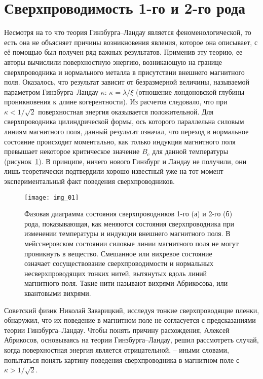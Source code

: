 \section{Сверхпроводимость 1-го и 2-го рода}

Несмотря на то что теория Гинзбурга–Ландау является феноменологической, то 
есть она не объясняет причины возникновения явления, которое она описывает, с 
её помощью был получен ряд важных результатов. Применив эту теорию, ее авторы 
вычислили поверхностную энергию, возникающую на границе сверхпроводника и 
нормального металла в присутствии внешнего магнитного поля. Оказалось, что 
результат зависит от безразмерной величины, называемой параметром 
Гинзбурга–Ландау \( \kappa \): \( \kappa = \lambda/\xi \) (отношение 
лондоновской глубины проникновения к длине когерентности). Из расчетов 
следовало, что при \( \kappa < 1/\sqrt{2} \) поверхностная энергия оказывается 
положительной. Для сверхпроводника цилиндрической формы, ось которого 
параллельна силовым линиям магнитного поля, данный результат означал, что 
переход в нормальное состояние происходит моментально, как только индукция 
магнитного поля превышает некоторое критическое значение \( B_c \) для данной 
температуры (рисунок~\ref{img:01}). В принципе, ничего нового Гинзбург и 
Ландау не получили, они лишь теоретически подтвердили хорошо известный уже на 
тот момент экспериментальный факт поведения сверхпроводников.

\begin{figure}[h!]
    \center
    \texttt{[image: img\_01]}
    \caption{Фазовая диаграмма состояния сверхпроводников 1-го (а) и 
        2-го (б) рода, показывающая, как меняются состояния сверхпроводника 
        при изменении температуры и индукции внешнего магнитного поля. В 
        мейсснеровском состоянии силовые линии магнитного поля не могут 
        проникнуть в вещество. Смешанное или вихревое состояние означает 
        сосуществование сверхпроводимости и нормальных несверхпроводящих 
        тонких нитей, вытянутых вдоль линий магнитного поля. Такие нити 
        называют вихрями Абрикосова, или квантовыми вихрями.}
    \label{img:01}
\end{figure}

Советский физик Николай Заварицкий, исследуя тонкие сверхпроводящие пленки, 
обнаружил, что их поведение в магнитном поле не согласуется с предсказаниями 
теории Гинзбурга–Ландау. Чтобы понять причину расхождения, Алексей Абрикосов, 
основываясь на теории Гинзбурга–Ландау, решил рассмотреть случай, когда 
поверхностная энергия является отрицательной, -- иными словами, попытаться 
понять картину поведения сверхпроводника в магнитном поле с 
\( \kappa > 1/\sqrt{2} \).

